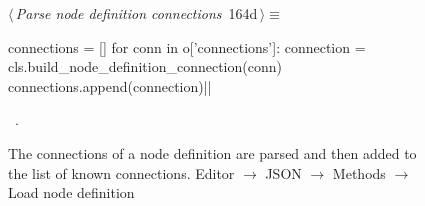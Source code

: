 \documentclass[%
    a4paper,    %
    justified,  %
    nobib,      %
    openany     %
]{tufte-book}
\makeatletter
\renewcommand{\label}[1]{\@tufte@label{##1}}%
\makeatother
\begin{document}
\begin{figure}[!htbp]
\begin{flushleft} \small
\begin{minipage}{\linewidth}\label{scrap129}\raggedright\small
{} $\langle\,${\itshape Parse node definition connections}\nobreak\ {\footnotesize {164d}}$\,\rangle\equiv$
\vspace{-1ex}
\begin{pythoncode}
connections = []
for conn in o['connections']:
    connection = cls.build_node_definition_connection(conn)
    connections.append(connection)|\NWsep|
\end{pythoncode}
\vspace{1.5ex}
\footnotesize
\begin{list}{}{\setlength{\itemsep}{-\parsep}\setlength{\itemindent}{-\leftmargin}}
\item \NWtxtMacroRefIn\ .

\item{}
\end{list}
\end{minipage}\vspace{4ex}
\end{flushleft}
\caption{The connections of a node definition are parsed and then added to
the list of known connections.
  \newline{}\newline{}Editor $\rightarrow$ JSON $\rightarrow$
  Methods $\rightarrow$ Load node definition}
\end{figure}
\end{document}
